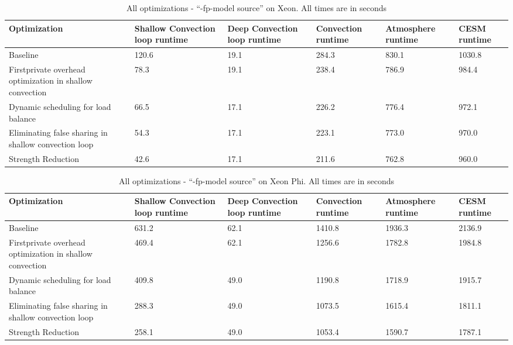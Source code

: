 \begin{table*}
 \small
 \centering
 \begin{tabular}{||p{1.5in}|p{0.75in}|p{0.75in}|p{0.75in}|p{0.75in}|p{0.75in}||}
\hline\hline
Optimization &	Shallow Convection loop runtime	& Deep Convection loop runtime	& Convection runtime & Atmosphere runtime & CESM runtime \\ \hline\hline
Baseline & 120.6 & 19.1	& 284.3	& 830.1	& 1030.8 \\ \hline
Firstprivate overhead optimization in shallow convection & 78.3	& 19.1 & 238.4 & 786.9 & 984.4 \\ \hline
Dynamic scheduling for load balance & 66.5 & 17.1 & 226.2 & 776.4 & 972.1 \\ \hline
Eliminating false sharing in shallow convection loop & 54.3 & 17.1 & 223.1 & 773.0 & 970.0 \\ \hline
Strength Reduction & 42.6 & 17.1 & 211.6 & 762.8 & 960.0  \\\hline\hline
  \end{tabular}
\caption{All optimizations - ``-fp-model source'' on Xeon. All times are in seconds}
\label{all_fpmodel_xeon}
\end{table*}


\begin{table*}
 \small
 \centering
 \begin{tabular}{||p{1.5in}|p{0.75in}|p{0.75in}|p{0.75in}|p{0.75in}|p{0.75in}||}
\hline\hline
Optimization &	Shallow Convection loop runtime	& Deep Convection loop runtime	& Convection runtime & Atmosphere runtime & CESM runtime \\ \hline\hline
Baseline & 631.2 & 62.1 & 1410.8 & 1936.3 & 2136.9 \\ \hline
Firstprivate overhead optimization in shallow convection & 469.4 & 62.1	& 1256.6 & 1782.8 & 1984.8 \\ \hline
Dynamic scheduling for load balance & 409.8 & 49.0 & 1190.8 & 1718.9 & 1915.7 \\ \hline
Eliminating false sharing in shallow convection loop & 288.3 & 49.0 & 1073.5 & 1615.4 & 1811.1 \\ \hline
Strength Reduction & 258.1 & 49.0 & 1053.4 & 1590.7 & 1787.1  \\ \hline\hline
  \end{tabular}
\caption{All optimizations - ``-fp-model source'' on Xeon Phi. All times are in seconds}
\label{all_fpmodel_xeonphi}
\end{table*}



